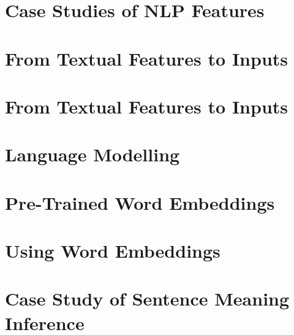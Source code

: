 \documentclass{article}
\begin{document}
\section{Case Studies of NLP Features}

\section{From Textual Features to Inputs}

\section{From Textual Features to Inputs}

\section{Language Modelling}

\section{Pre-Trained Word Embeddings}

\section{Using Word Embeddings}

\section{Case Study of Sentence Meaning Inference}
\printbibliography
\end{document}
